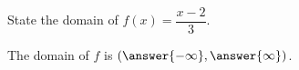\documentclass{ximera}
\author{Carl Stitz \and Jeff Zeager \and Bart Snapp \and Matthew Carr}
\begin{document}
\begin{exercise}



State the domain of $f(x)=\dfrac{x - 2}{3}$.
\begin{center}
The domain of $f$ is $(\answer{-\infty},\answer{\infty})$.
\end{center}

\end{exercise}
\end{document}
